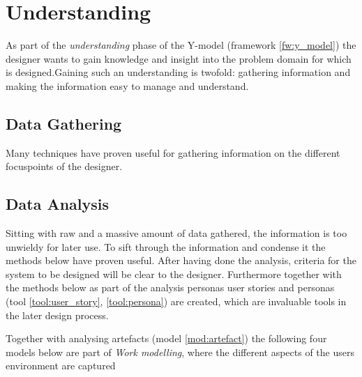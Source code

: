\section{Understanding} \label{sec:understanding}
As part of the \emph{understanding} phase of the Y-model (framework \ref{fw:y_model}) the designer wants to gain knowledge and insight into the problem domain for which is designed.Gaining such an understanding is twofold: gathering information and making the information easy to manage and understand.

\subsection{Data Gathering} \label{sec:data_gathering}
Many techniques have proven useful for gathering information on the different focuspoints of the designer.






\subsection{Data Analysis} \label{sec:data_analysis}
Sitting with raw and a massive amount of data gathered, the information is too unwieldy for later use. To sift through the information and condense it the methods below have proven useful. After having done the analysis, criteria for the system to be designed will be clear to the designer. Furthermore together with the methods below as part of the analysis personas user stories and personas (tool \ref{tool:user_story}, \ref{tool:persona}) are created, which are invaluable tools in the later design process.



Together with analysing artefacts (model \ref{mod:artefact}) the following four models below are part of \emph{Work modelling}, where the different aspects of the users environment are captured \cite[p. 277]{benyon_10}





